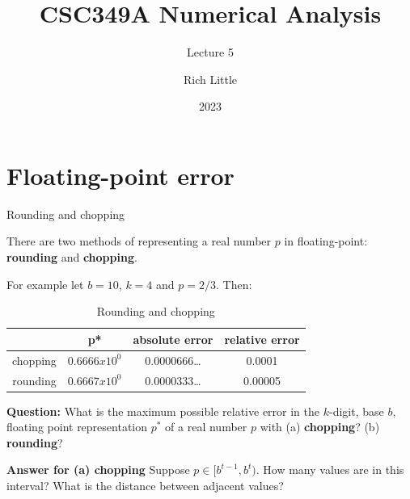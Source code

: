 \documentclass[12pt]{beamer}
\title[CSC349A Numerical Analysis]{CSC349A Numerical Analysis}
\subtitle[Leture 5]{Lecture 5}
\date[2023]{2023}
\author[R. Little]{Rich Little}
\institute[University of Victoria]{University of Victoria}
\begin{document}
\frame{\maketitle} %



\section{Floating-point error}
\begin{frame}{Rounding and chopping}

There are two methods of representing a real number $p$ in floating-point: {\bf rounding} and {\bf chopping}. 

For example let $b = 10$, $k=4$ and $p = 2/3$. Then: 


\begin{table}[h]
\begin{tabular}{|c|c|c|c|} 
\hline
         & p*            & absolute error & relative error \\
\hline
chopping & $0.6666x10^0$ & 0.0000666\dots & 0.0001 \\ 
\hline
rounding & $0.6667x10^0$ & 0.0000333\dots & 0.00005 \\  
\hline 
\end{tabular} 
\caption{Rounding and chopping} 
\end{table} 

\end{frame}

\begin{frame}
{\bf Question:} What is the maximum possible relative error in the $k$-digit, base $b$, floating point representation $p^*$ of a real number $p$  with (a) {\bf chopping}? (b) {\bf rounding}?


\end{frame} 

\begin{frame}
{\bf Answer for (a) chopping} Suppose $p \in [b^{t-1},b^t)$. How many values are in this interval? What is the distance between adjacent values?
\vspace{3 in}


\end{frame} 
\end{document}
